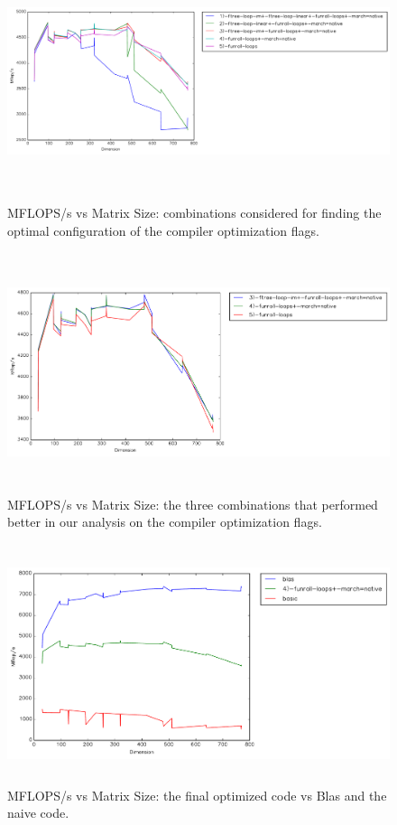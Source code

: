 \documentclass{article}
\begin{document}
  \begin{figure}[h]
    \centering
    \includegraphics[width=16cm,height=7cm]{timing-final-config.pdf}
    \caption{MFLOPS/s vs Matrix Size: combinations considered for finding the optimal configuration of the compiler optimization flags.}
    \label{fig:combo-analysis1}
  \end{figure}

  \begin{figure}[h]
    \centering
    \includegraphics[width=16cm,height=7cm]{timing-final-config-clear.pdf}
    \caption{MFLOPS/s vs Matrix Size: the three combinations that performed better in our analysis on the compiler optimization flags.}
    \label{fig:combo-analysis2}
  \end{figure}
  
    \begin{figure}[h]
    \centering
    \includegraphics[width=16cm,height=7cm]{timing-final-vs-blas.pdf}
    \caption{MFLOPS/s vs Matrix Size: the final optimized code vs Blas and the naive code.}
    \label{fig:final-vs-blas}
  \end{figure}
\end{document}
